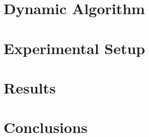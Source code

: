 \documentclass[10pt, letterpaper]{article}
\begin{document}
\section{Dynamic Algorithm}


\section{Experimental Setup}


\section{Results}


\section{Conclusions}
\end{document}
